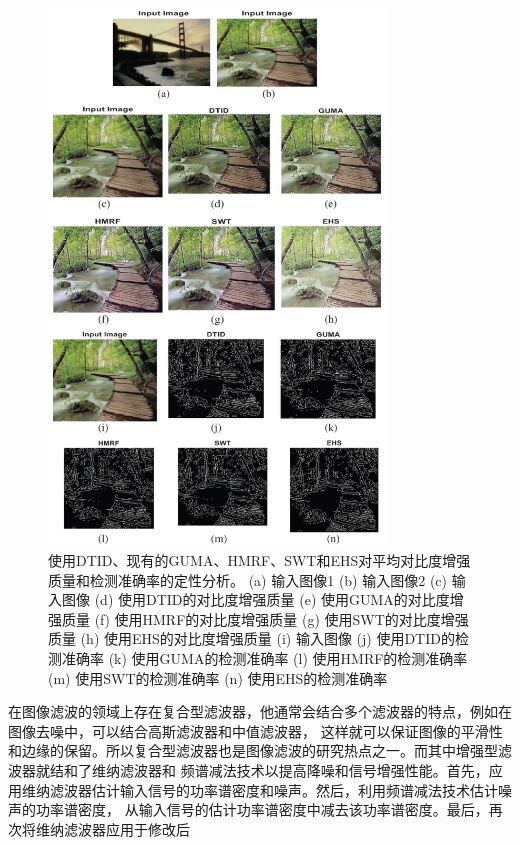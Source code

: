 \begin{figure}[htbp]
	\begin{center}
		\includegraphics[width = 0.8\textwidth]{images/03.eps}
		\caption{使用DTID、现有的GUMA、HMRF、SWT和EHS对平均对比度增强质量和检测准确率的定性分析。
        (a) 输入图像1 (b) 输入图像2 (c) 输入图像 (d) 使用DTID的对比度增强质量 (e) 使用GUMA的对比度增强质量 
        (f) 使用HMRF的对比度增强质量 (g) 使用SWT的对比度增强质量 (h) 使用EHS的对比度增强质量 
        (i) 输入图像 (j) 使用DTID的检测准确率 (k) 使用GUMA的检测准确率 (l) 使用HMRF的检测准确率 
        (m) 使用SWT的检测准确率 (n) 使用EHS的检测准确率} 
		\label{03} %
	\end{center}
\end{figure}

在图像滤波的领域上存在复合型滤波器，他通常会结合多个滤波器的特点，例如在图像去噪中，可以结合高斯滤波器和中值滤波器，
这样就可以保证图像的平滑性和边缘的保留。所以复合型滤波器也是图像滤波的研究热点之一。而其中增强型滤波器就结和了维纳滤波器和
频谱减法技术以提高降噪和信号增强性能。首先，应用维纳滤波器估计输入信号的功率谱密度和噪声。然后，利用频谱减法技术估计噪声的功率谱密度，
从输入信号的估计功率谱密度中减去该功率谱密度。最后，再次将维纳滤波器应用于修改后

